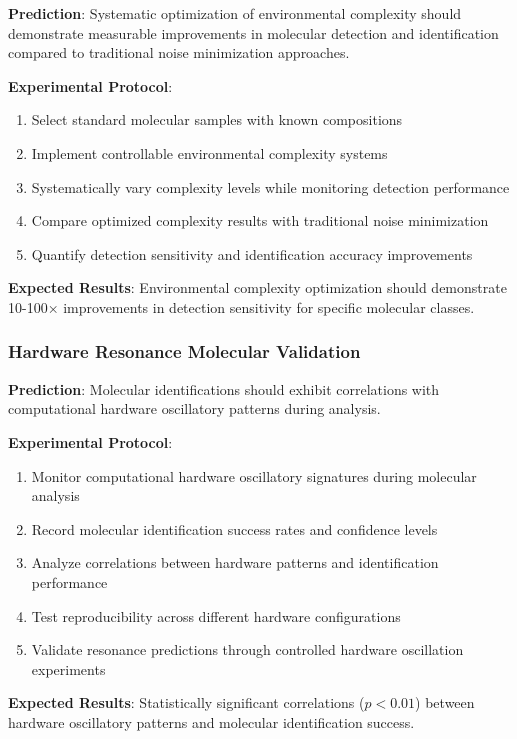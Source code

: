 \documentclass[11pt,a4paper]{article}
\theoremstyle{remark}
\begin{document}
{{{{{{{{{{\textbf{Prediction}: Systematic optimization of environmental complexity should demonstrate measurable improvements in molecular detection and identification compared to traditional noise minimization approaches.

\textbf{Experimental Protocol}:
\begin{enumerate}
\item Select standard molecular samples with known compositions
\item Implement controllable environmental complexity systems
\item Systematically vary complexity levels while monitoring detection performance
\item Compare optimized complexity results with traditional noise minimization
\item Quantify detection sensitivity and identification accuracy improvements
\end{enumerate}

\textbf{Expected Results}: Environmental complexity optimization should demonstrate 10-100× improvements in detection sensitivity for specific molecular classes.

\subsubsection{Hardware Resonance Molecular Validation}

\textbf{Prediction}: Molecular identifications should exhibit correlations with computational hardware oscillatory patterns during analysis.

\textbf{Experimental Protocol}:
\begin{enumerate}
\item Monitor computational hardware oscillatory signatures during molecular analysis
\item Record molecular identification success rates and confidence levels
\item Analyze correlations between hardware patterns and identification performance
\item Test reproducibility across different hardware configurations
\item Validate resonance predictions through controlled hardware oscillation experiments
\end{enumerate}

\textbf{Expected Results}: Statistically significant correlations ($p < 0.01$) between hardware oscillatory patterns and molecular identification success.

}}}}}}}}}}
\end{document}
